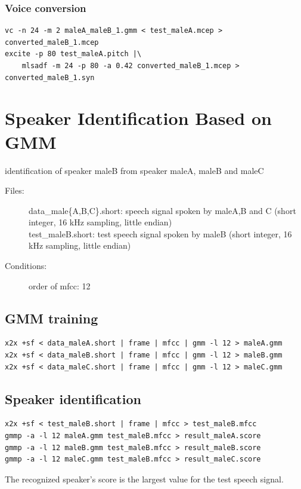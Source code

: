 \documentclass[a4paper,10pt]{article}
\begin{document}
\subsubsection{Voice conversion}
\begin{verbatim}
vc -n 24 -m 2 maleA_maleB_1.gmm < test_maleA.mcep > converted_maleB_1.mcep
excite -p 80 test_maleA.pitch |\
    mlsadf -m 24 -p 80 -a 0.42 converted_maleB_1.mcep > converted_maleB_1.syn
\end{verbatim}

\section{Speaker Identification Based on GMM}

identification of speaker maleB from speaker maleA, maleB and maleC

\begin{description}
\item[Files:]
data\_male\{A,B,C\}.short: speech signal spoken by maleA,B and C
(short integer, 16 kHz sampling, little endian)\\
test\_maleB.short:
test speech signal spoken by maleB (short integer, 16 kHz
           sampling, little endian)
\item[Conditions:]
  order of mfcc: 12
\end{description}

\subsection{GMM training}

\begin{verbatim}
x2x +sf < data_maleA.short | frame | mfcc | gmm -l 12 > maleA.gmm
x2x +sf < data_maleB.short | frame | mfcc | gmm -l 12 > maleB.gmm
x2x +sf < data_maleC.short | frame | mfcc | gmm -l 12 > maleC.gmm
\end{verbatim}

\subsection{Speaker identification}

\begin{verbatim}
x2x +sf < test_maleB.short | frame | mfcc > test_maleB.mfcc
gmmp -a -l 12 maleA.gmm test_maleB.mfcc > result_maleA.score
gmmp -a -l 12 maleB.gmm test_maleB.mfcc > result_maleB.score
gmmp -a -l 12 maleC.gmm test_maleB.mfcc > result_maleC.score
\end{verbatim}

The recognized speaker's score is the largest value for the test
speech signal.
\end{document}

